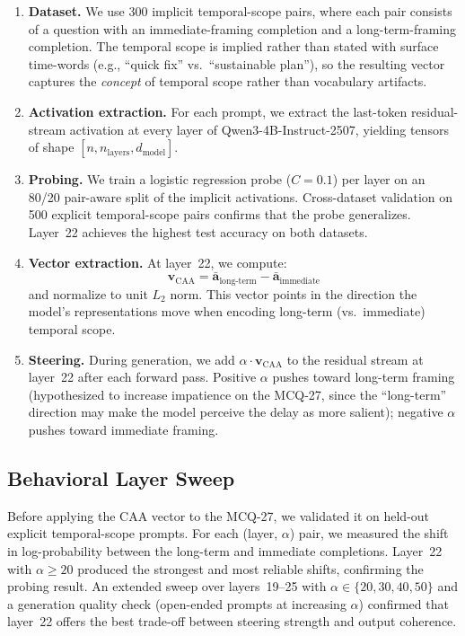 \begin{enumerate}
    \item \textbf{Dataset.} We use 300 implicit temporal-scope pairs, where each pair consists of a question with an immediate-framing completion and a long-term-framing completion. The temporal scope is implied rather than stated with surface time-words (e.g., ``quick fix'' vs.\ ``sustainable plan''), so the resulting vector captures the \emph{concept} of temporal scope rather than vocabulary artifacts.
    \item \textbf{Activation extraction.} For each prompt, we extract the last-token residual-stream activation at every layer of Qwen3-4B-Instruct-2507, yielding tensors of shape $[n, n_{\text{layers}}, d_{\text{model}}]$.
    \item \textbf{Probing.} We train a logistic regression probe ($C = 0.1$) per layer on an 80/20 pair-aware split of the implicit activations. Cross-dataset validation on 500 explicit temporal-scope pairs confirms that the probe generalizes. Layer~22 achieves the highest test accuracy on both datasets.
    \item \textbf{Vector extraction.} At layer~22, we compute:
    \begin{equation}
        \mathbf{v}_{\text{CAA}} = \bar{\mathbf{a}}_{\text{long-term}} - \bar{\mathbf{a}}_{\text{immediate}}
    \end{equation}
    and normalize to unit $L_2$ norm. This vector points in the direction the model's representations move when encoding long-term (vs.\ immediate) temporal scope.
    \item \textbf{Steering.} During generation, we add $\alpha \cdot \mathbf{v}_{\text{CAA}}$ to the residual stream at layer~22 after each forward pass. Positive $\alpha$ pushes toward long-term framing (hypothesized to increase impatience on the MCQ-27, since the ``long-term'' direction may make the model perceive the delay as more salient); negative $\alpha$ pushes toward immediate framing.
\end{enumerate}

\subsection{Behavioral Layer Sweep}

Before applying the CAA vector to the MCQ-27, we validated it on held-out explicit temporal-scope prompts. For each (layer, $\alpha$) pair, we measured the shift in log-probability between the long-term and immediate completions. Layer~22 with $\alpha \geq 20$ produced the strongest and most reliable shifts, confirming the probing result. An extended sweep over layers~19--25 with $\alpha \in \{20, 30, 40, 50\}$ and a generation quality check (open-ended prompts at increasing $\alpha$) confirmed that layer~22 offers the best trade-off between steering strength and output coherence.

